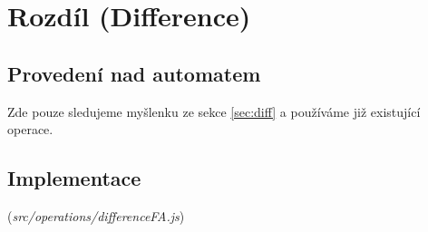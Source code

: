 \section{Rozdíl (Difference)}\label{sec:diffImpl}
\subsection{Provedení nad automatem}
Zde pouze sledujeme myšlenku ze sekce \ref{sec:diff} a používáme již existující operace.
\subsection{Implementace}
(\textit{src/operations/differenceFA.js})